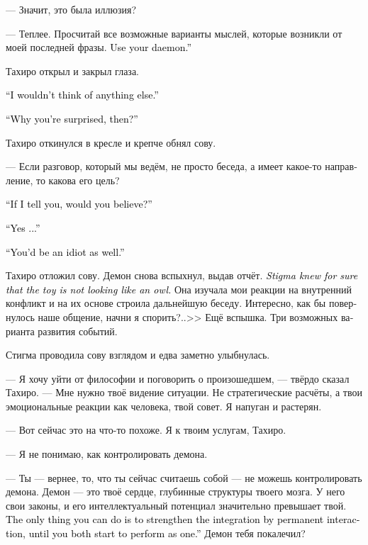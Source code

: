 \documentclass[a4paper,12pt,fleqn]{book}\usepackage{cooltooltips}\usepackage{polyglossia}\setdefaultlanguage[babelshorthands=true]{russian}\setotherlanguage{english}\defaultfontfeatures{Ligatures=TeX,Mapping=tex-text} \usepackage{xcolor}\definecolor{lightgray}{HTML}{bbbbbb}\color{lightgray}\newcommand{\ml}[3]{\textenglish{\textcolor{black}{#3}}}
\begin{document}
{--- Значит, это была иллюзия?

--- Теплее.
Просчитай все возможные варианты мыслей, которые возникли от моей последней фразы.
\ml{$0$}
{Используй демона.}
{Use your daemon.''}

Тахиро открыл и закрыл глаза.

\ml{$0$}
{--- Я бы не подумал ни о чём другом.}
{``I wouldn't think of anything else.''}

\ml{$0$}
{--- Чему ты тогда удивляешься?}
{``Why you're surprised, then?''}

Тахиро откинулся в кресле и крепче обнял сову.

--- Если разговор, который мы ведём, не просто беседа, а имеет какое-то направление, то какова его цель?

\ml{$0$}
{--- Если я скажу, ты мне поверишь?}
{``If I tell you, would you believe?''}

\ml{$0$}
{--- Да...}
{``Yes ...''}

\ml{$0$}
{--- И будешь идиотом.}
{``You'd be an idiot as well.''}

Тахиро отложил сову.
Демон снова вспыхнул, выдав отчёт.
\ml{$0$}
{<<Стигма точно знала, что игрушка не похожа на сову.}
{\textit{Stigma knew for sure that the toy is not looking like an owl.}}
Она изучала мои реакции на внутренний конфликт и на их основе строила дальнейшую беседу.
Интересно, как бы повернулось наше общение, начни я спорить?..>>
Ещё вспышка.
Три возможных варианта развития событий.

Стигма проводила сову взглядом и едва заметно улыбнулась.

--- Я хочу уйти от философии и поговорить о произошедшем, --- твёрдо сказал Тахиро.
--- Мне нужно твоё видение ситуации.
Не стратегические расчёты, а твои эмоциональные реакции как человека, твой совет.
Я напуган и растерян.

--- Вот сейчас это на что-то похоже.
Я к твоим услугам, Тахиро.

--- Я не понимаю, как контролировать демона.

--- Ты --- вернее, то, что ты сейчас считаешь собой --- не можешь контролировать демона.
Демон --- это твоё сердце, глубинные структуры твоего мозга.
У него свои законы, и его интеллектуальный потенциал значительно превышает твой.
\ml{$0$}
{Всё, что ты можешь --- это усилить интеграцию постоянным взаимодействием, пока вы не будете действовать как единое целое.}
{The only thing you can do is to strengthen the integration by permanent interaction, until you both start to perform as one.''}
Демон тебя покалечил?

}
\end{document}
